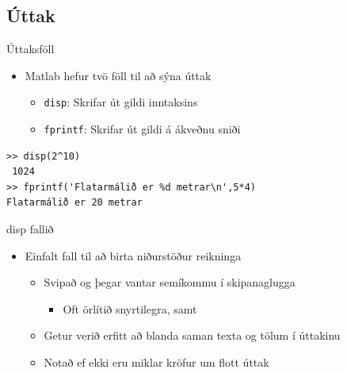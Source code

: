 \documentclass{beamer}
\begin{document}
\subsection{Úttak}

\begin{frame}[fragile]{Úttaksföll}
\begin{itemize}
 \item Matlab hefur tvö föll til að sýna úttak
 \begin{itemize}
  \item \texttt{disp}: Skrifar út gildi inntaksins
  \item \texttt{fprintf}: Skrifar út gildi á ákveðnu sniði
 \end{itemize}
\end{itemize}
\begin{verbatim}
>> disp(2^10)
 1024
>> fprintf('Flatarmálið er %d metrar\n',5*4)
Flatarmálið er 20 metrar
\end{verbatim}
\end{frame}

\begin{frame}{disp fallið}
\begin{itemize}
 \item Einfalt fall til að birta niðurstöður reikninga
 \begin{itemize}
  \item Svipað og þegar vantar semíkommu í skipanaglugga
  \begin{itemize}
   \item Oft örlítið snyrtilegra, samt
  \end{itemize}
  \item Getur verið erfitt að blanda saman texta og tölum í úttakinu
  \item Notað ef ekki eru miklar kröfur um flott úttak
 \end{itemize}
\end{itemize}
\end{frame}
\end{document}
